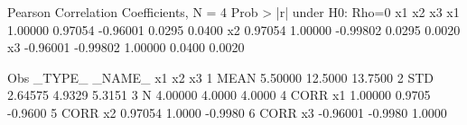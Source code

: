 \documentclass{article}
\begin{document}
\begin{Woutput}
  Pearson Correlation Coefficients, N = 4
         Prob > |r| under H0: Rho=0
              x1            x2            x3
x1       1.00000       0.97054      -0.96001
                        0.0295        0.0400
x2       0.97054       1.00000      -0.99802
          0.0295                      0.0020
x3      -0.96001      -0.99802       1.00000
          0.0400        0.0020

Obs    _TYPE_    _NAME_       x1             x2          x3
 1      MEAN                5.50000     12.5000     13.7500
 2      STD                 2.64575      4.9329      5.3151
 3      N                   4.00000      4.0000      4.0000
 4      CORR       x1       1.00000      0.9705     -0.9600
 5      CORR       x2       0.97054      1.0000     -0.9980
 6      CORR       x3      -0.96001     -0.9980      1.0000
\end{Woutput}
\end{document}
